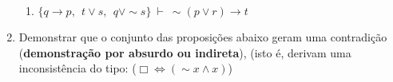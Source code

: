\documentclass[12pt, a4paper,final]{article}
\begin{document}
\begin{enumerate}
\begin{enumerate}
\item $\{ q \rightarrow p,\:\: t \vee s,\:\: q \vee\sim s \} ~\vdash~ \sim (p \vee r) \rightarrow t$




\begin{comment}

PRONTAS PARA o FUTURO

\item $\{ p \vee q \rightarrow r,~ s \rightarrow \sim r \wedge \sim t,~ s \vee u \} ~\vdash~ p \rightarrow u$

\item $\{ p \rightarrow q,~ r \rightarrow t,~ s \rightarrow r,~ p \vee s \} ~\vdash~ \sim q \rightarrow t $

\end{comment}


\end{enumerate}



\item Demonstrar que o conjunto das proposi\c c\~oes abaixo geram uma contradi\c c\~ao ({\bf demons\-tra\c c\~ao por absurdo ou indireta}),  (isto \'e, derivam uma inconsist\^encia do tipo: ($\Box \Leftrightarrow (\sim x \wedge x)$)

\begin{enumerate}









\end{enumerate}
\end{enumerate}
\end{document}
